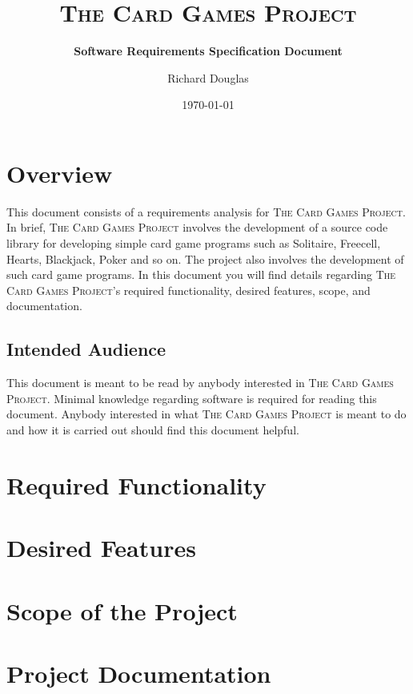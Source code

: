 \documentclass{article}[12pt,a4paper]
\title{\textsc{The Card Games Project}}
\subtitle{\textbf{Software Requirements Specification Document}}
\author{\Large{Richard Douglas}}
\date{\today{}}
\begin{document}
  \maketitle
  
  \section*{Overview}
  This document consists of a requirements analysis for \textsc{The Card Games Project}.
  In brief, \textsc{The Card Games Project} involves the development of a source code library
  for developing simple card game programs such as Solitaire, Freecell, Hearts, Blackjack,
  Poker and so on. The project also involves the development of such card game programs. 
  In this document you will find details regarding \textsc{The Card Games Project}'s required functionality, 
  desired features, scope, and documentation.
  
  \subsection*{Intended Audience}
  This document is meant to be read by anybody interested in \textsc{The Card Games Project}.
  Minimal knowledge regarding software is required for reading this document. Anybody
  interested in what \textsc{The Card Games Project} is meant to do and how it is carried out
  should find this document helpful.
  
  \tableofcontents
  
  \pagebreak
  
  \section{Required Functionality}
  
  \section{Desired Features}
  
  \section{Scope of the Project}
  
  \section{Project Documentation}
  
\end{document}
